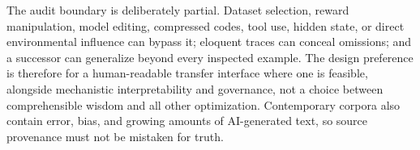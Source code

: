 \documentclass[11pt]{article}
\begin{document}
			The audit boundary is deliberately partial. Dataset selection, reward manipulation, model editing, compressed codes, tool use, hidden state, or direct environmental influence can bypass it; eloquent traces can conceal omissions; and a successor can generalize beyond every inspected example. The design preference is therefore for a human-readable transfer interface where one is feasible, alongside mechanistic interpretability and governance, not a choice between comprehensible wisdom and all other optimization. Contemporary corpora also contain error, bias, and growing amounts of AI-generated text, so source provenance must not be mistaken for truth.
\end{document}
